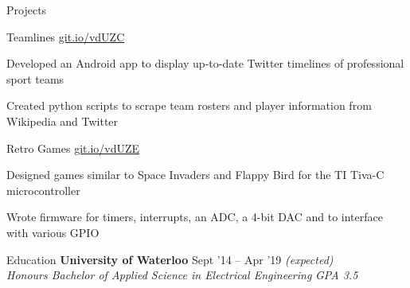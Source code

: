\documentclass{resume} %
\begin{document}
	\begin{rSection}{Projects}
		\begin{rSubsection}{Teamlines}
			{\href{https://git.io/vdUZC}{git.io/vdUZC}}
			{}{}
			
			\item Developed an Android app to display up-to-date Twitter timelines of professional sport teams
			\item Created python scripts to scrape team rosters and player information from Wikipedia and Twitter
		\end{rSubsection}
		\begin{rSubsection}{Retro Games}
			{\href{https://git.io/vdUZE}{git.io/vdUZE}}
			{}{}
		
			\item Designed games similar to Space Invaders and Flappy Bird for the TI Tiva-C microcontroller
			\item Wrote firmware for timers, interrupts, an ADC, a 4-bit DAC and to interface with various GPIO
		\end{rSubsection}
	\end{rSection}
	
	
	\begin{rSection}{Education}
		{\bf University of Waterloo} \hfill {Sept '14 -- Apr '19 \em (expected)} \\
		{\em Honours Bachelor of Applied Science in Electrical Engineering} \hfill {\em GPA 3.5}
		\vspace{0.5em}
	\end{rSection}
	
\end{document}
